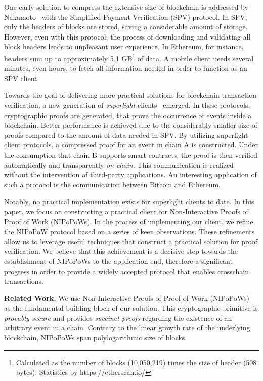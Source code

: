 One early solution to compress the extensive size of blockchain is addressed by
Nakamoto~\cite{nakamoto} with the Simplified Payment Verification (SPV)
protocol. In SPV, only the headers of blocks are stored, saving a
considerable amount of storage.  However, even with this protocol, the process
of downloading and validating all block headers leads to unpleasant user
experience. In Ethereum, for instance, headers sum up to approximately 5.1
GB\footnote{Calculated as the number of blocks (10,050,219) times the size of
header (508 bytes). Statistics by https://etherscan.io/} of data. A mobile
client needs several minutes, even hours, to fetch all information needed in
order to function as an SPV client.

Towards the goal of delivering more practical solutions for blockchain
transaction verification, a new generation of \emph{superlight}
clients~\cite{popow,nipopows,compactsuperblocks, flyclient} emerged. In these
protocols, cryptographic proofs are generated, that prove the occurrence of
events inside a blockchain. Better performance is achieved due to the
considerably smaller size of proofs compared to the amount of data needed in
SPV. By utilizing superlight client protocols, a compressed proof for an event
in chain A is constructed. Under the consumption that chain B supports smart
contracts, the proof is then verified automatically and transparently
\emph{on-chain}. This communication is realized without the intervention of
third-party applications.  An interesting application of such a protocol is the
communication between Bitcoin and Ethereum.

Notably, no practical implementation exists for superlight clients to date. In
this paper, we focus on constructing a practical client for Non-Interactive
Proofs of Proof of Work (NIPoPoWs). In the process of implementing our client,
we refine the NIPoPoW protocol based on a series of keen observations. These
refinements allow us to leverage useful techniques that construct a practical
solution for proof verification. We believe that this achievement is a decisive
step towards the establishment of NIPoPoWs to the application end, therefore a
significant progress in order to provide a widely accepted protocol that
enables crosschain transactions.

\noindent

\textbf{Related Work.} We use Non-Interactive Proofs of Proof of Work
(NIPoPoWs)~\cite{nipopows, pow-sidechains} as the fundamental building block
of our solution. This cryptographic primitive is \emph{provably secure} and
provides \emph{succinct proofs} regarding the existence of an arbitrary event
in a chain. Contrary to the linear growth rate of the underlying blockchain,
NIPoPoWs span polylogarithmic size of blocks.

